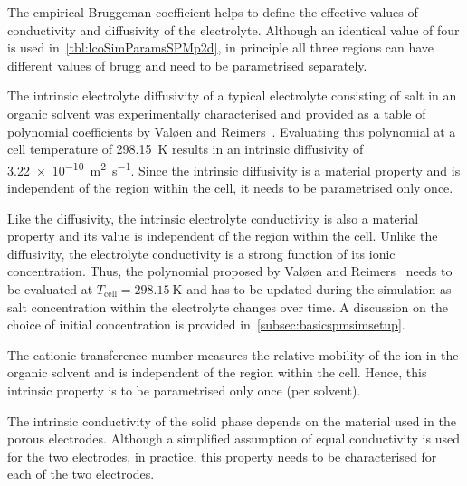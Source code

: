 \begin{enumdescriptnum}[leftmargin=!,itemsep=1ex,labelwidth=\widthof{$\symbf{\text{brugg}_j}\ \scriptstyle (\times 3)$abc}
    ,partopsep=0pt
    ,topsep=0pt
    ]

      The  empirical Bruggeman  coefficient  helps
    to  define  the   effective  values  of  conductivity   and  diffusivity  of
    the   electrolyte.   Although  an   identical   value   of  four   is   used
    in~\cref{tbl:lcoSimParamsSPMp2d}, in  principle all  three regions  can have
    different values of brugg and need to be parametrised separately.

      The  intrinsic  electrolyte   diffusivity  of  a  typical
    electrolyte  consisting  of    salt in  an  organic  solvent  was
    experimentally  characterised   and  provided  as  a   table  of  polynomial
    coefficients  by  Valøen  and  Reimers~\cite{Valoen2005}.  Evaluating  this
    polynomial  at a  cell  temperature of  \SI{298.15}{\kelvin}  results in  an
    intrinsic diffusivity of \SI{3.22e-10}{\meter\squared\per\second}. Since the
    intrinsic  diffusivity is  a material  property  and is  independent of  the
    region within the cell, it needs to be parametrised only once.

       Like    the   diffusivity,   the
    intrinsic electrolyte conductivity is also a material property and its value
    is independent  of the region within  the cell. Unlike the  diffusivity, the
    electrolyte conductivity  is a strong  function of its  ionic concentration.
    Thus, the polynomial proposed by Valøen and Reimers~\cite{Valoen2005} needs
    to  be evaluated  at  $T_\text{cell}= \SI{298.15}{\kelvin}$  and  has to  be
    updated during the  simulation as salt concentration  within the electrolyte
    changes over time. A discussion on the choice of initial concentration is
    provided in~\cref{subsec:basicspmsimsetup}.

      The  cationic transference  number
    measures the relative  mobility of the  ion in  the organic solvent
    and is  independent of  the region  within the  cell. Hence,  this intrinsic
    property is to be parametrised only once (per solvent).

      The  intrinsic conductivity  of
    the  solid phase  depends on  the material  used in  the porous  electrodes.
    Although a simplified  assumption of equal conductivity is used  for the two
    electrodes, in practice, this property needs to be characterised for each of
    the two electrodes.

\end{enumdescriptnum}

